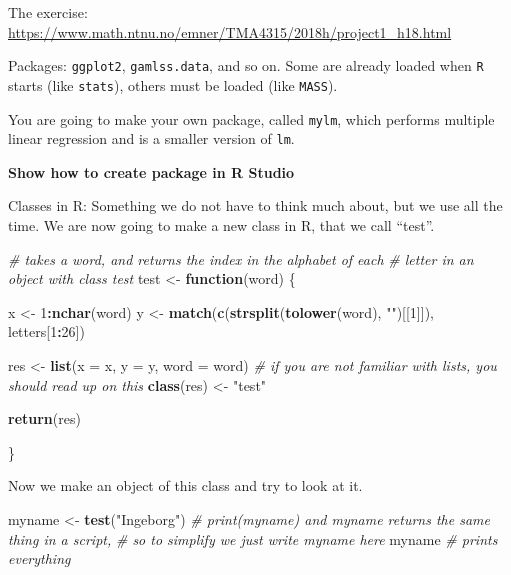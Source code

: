 \documentclass[
]{article}
\newenvironment{Shaded}{\begin{snugshade}}{\end{snugshade}}
\newcommand{\AttributeTok}[1]{\textcolor[rgb]{0.13,0.29,0.53}{#1}}
\newcommand{\CommentTok}[1]{\textcolor[rgb]{0.56,0.35,0.01}{\textit{#1}}}
\newcommand{\ControlFlowTok}[1]{\textcolor[rgb]{0.13,0.29,0.53}{\textbf{#1}}}
\newcommand{\DecValTok}[1]{\textcolor[rgb]{0.00,0.00,0.81}{#1}}
\newcommand{\FunctionTok}[1]{\textcolor[rgb]{0.13,0.29,0.53}{\textbf{#1}}}
\newcommand{\NormalTok}[1]{#1}
\newcommand{\OtherTok}[1]{\textcolor[rgb]{0.56,0.35,0.01}{#1}}
\newcommand{\SpecialCharTok}[1]{\textcolor[rgb]{0.81,0.36,0.00}{\textbf{#1}}}
\newcommand{\StringTok}[1]{\textcolor[rgb]{0.31,0.60,0.02}{#1}}
\begin{document}
The exercise:
\url{https://www.math.ntnu.no/emner/TMA4315/2018h/project1_h18.html}

Packages: \texttt{ggplot2}, \texttt{gamlss.data}, and so on. Some are
already loaded when \texttt{R} starts (like \texttt{stats}), others must
be loaded (like \texttt{MASS}).

You are going to make your own package, called \texttt{mylm}, which
performs multiple linear regression and is a smaller version of
\texttt{lm}.

\textbf{Show how to create package in R Studio}

Classes in R: Something we do not have to think much about, but we use
all the time. We are now going to make a new class in R, that we call
``test''.

\begin{Shaded}
\begin{Highlighting}[]
\CommentTok{\# takes a word, and returns the index in the alphabet of each}
\CommentTok{\# letter in an object with class \textquotesingle{}test\textquotesingle{}}
\NormalTok{test }\OtherTok{\textless{}{-}} \ControlFlowTok{function}\NormalTok{(word) \{}

\NormalTok{    x }\OtherTok{\textless{}{-}} \DecValTok{1}\SpecialCharTok{:}\FunctionTok{nchar}\NormalTok{(word)}
\NormalTok{    y }\OtherTok{\textless{}{-}} \FunctionTok{match}\NormalTok{(}\FunctionTok{c}\NormalTok{(}\FunctionTok{strsplit}\NormalTok{(}\FunctionTok{tolower}\NormalTok{(word), }\StringTok{""}\NormalTok{)[[}\DecValTok{1}\NormalTok{]]), letters[}\DecValTok{1}\SpecialCharTok{:}\DecValTok{26}\NormalTok{])}

\NormalTok{    res }\OtherTok{\textless{}{-}} \FunctionTok{list}\NormalTok{(}\AttributeTok{x =}\NormalTok{ x, }\AttributeTok{y =}\NormalTok{ y, }\AttributeTok{word =}\NormalTok{ word)  }\CommentTok{\# if you are not familiar with lists, you should read up on this}
    \FunctionTok{class}\NormalTok{(res) }\OtherTok{\textless{}{-}} \StringTok{"test"}

    \FunctionTok{return}\NormalTok{(res)}

\NormalTok{\}}
\end{Highlighting}
\end{Shaded}

Now we make an object of this class and try to look at it.

\begin{Shaded}
\begin{Highlighting}[]
\NormalTok{myname }\OtherTok{\textless{}{-}} \FunctionTok{test}\NormalTok{(}\StringTok{"Ingeborg"}\NormalTok{)}
\CommentTok{\# \textquotesingle{}print(myname)\textquotesingle{} and \textquotesingle{}myname\textquotesingle{} returns the same thing in a script,}
\CommentTok{\# so to simplify we just write \textquotesingle{}myname\textquotesingle{} here}
\NormalTok{myname  }\CommentTok{\# prints everything}
\end{Highlighting}
\end{Shaded}
\end{document}
